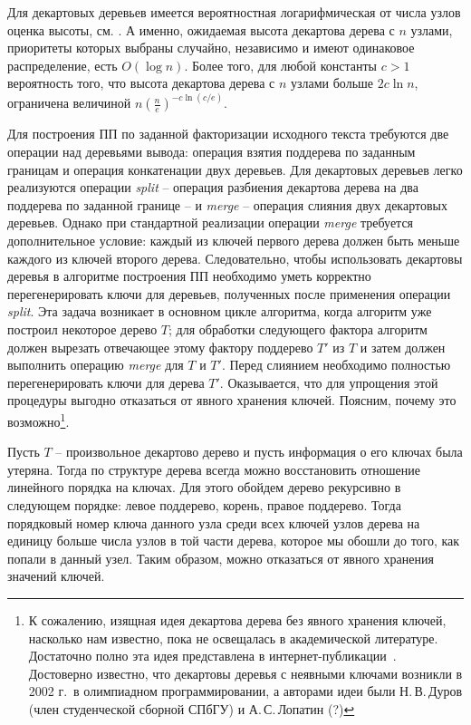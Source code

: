 ﻿\documentclass[11pt]{article}
\theoremstyle{remark}
\begin{document}
Для декартовых деревьев имеется вероятностная логарифмическая от числа узлов оценка высоты, см. \cite[п.\,4.1]{Seidel&Aragon:1996}. А
именно, ожидаемая высота декартова дерева с $n$ узлами, приоритеты которых выбраны случайно, независимо и имеют одинаковое распределение,
есть $O(\log n)$. Более того, для любой константы $c>1$ вероятность того, что высота декартова дерева с $n$ узлами больше $2c\ln n$,
ограничена величиной $n\left(\frac{n}{e}\right)^{-c\ln(c/e)}$.

Для построения ПП по заданной факторизации исходного текста требуются две операции над деревьями вывода: операция взятия поддерева по
заданным границам и операция конкатенации двух деревьев. Для декартовых деревьев легко реализуются операции \emph{split} -- операция
разбиения декартова дерева на два поддерева по заданной границе -- и \emph{merge} -- операция слияния двух декартовых деревьев. Однако при
стандартной реализации операции \emph{merge} требуется дополнительное условие: каждый из ключей первого дерева должен быть меньше каждого
из ключей второго дерева. Следовательно, чтобы использовать декартовы деревья в алгоритме построения ПП необходимо уметь корректно
перегенерировать ключи для деревьев, полученных после применения операции \emph{split}. Эта задача возникает в основном цикле алгоритма,
когда алгоритм уже построил некоторое дерево $T$; для обработки следующего фактора алгоритм должен вырезать отвечающее этому фактору
поддерево $T'$ из $T$ и затем должен выполнить операцию \emph{merge} для $T$ и $T'$. Перед слиянием необходимо полностью перегенерировать
ключи для дерева $T'$. Оказывается, что для упрощения этой процедуры выгодно отказаться от явного хранения ключей. Поясним, почему это
возможно\footnote{К сожалению, изящная идея декартова дерева без явного хранения ключей, насколько нам известно, пока не освещалась в
академической литературе. Достаточно полно эта идея представлена в интернет-публикации~\cite{Pol10}. Достоверно
известно, что декартовы деревья с неявными ключами возникли в 2002 г.\ в олимпиадном программировании, а авторами идеи
были Н.\,В.\,Дуров (член студенческой сборной СПбГУ) и А.\,С.\,Лопатин (?)}.

Пусть $T$ -- произвольное декартово дерево и пусть информация о его ключах была утеряна. Тогда по структуре дерева всегда можно
восстановить отношение линейного порядка на ключах. Для этого обойдем дерево рекурсивно в следующем порядке: левое поддерево, корень,
правое поддерево. Тогда порядковый номер ключа данного узла среди всех ключей узлов дерева на единицу больше числа узлов в той части
дерева, которое мы обошли до того, как попали в данный узел. Таким образом, можно отказаться от явного хранения значений ключей.
\end{document}
